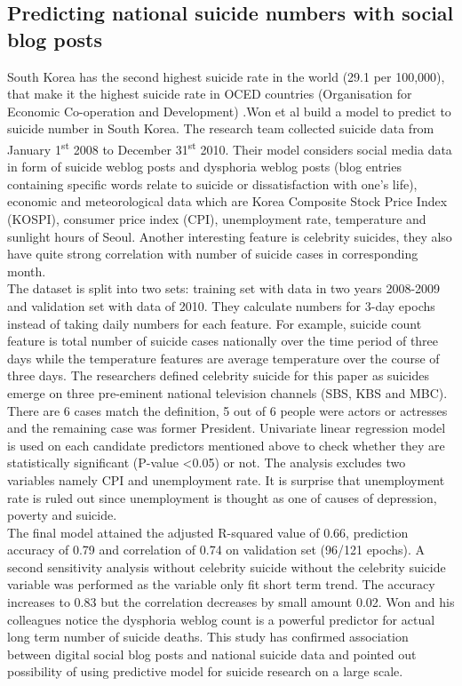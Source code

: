 \subsection{Predicting national suicide numbers with social blog posts}
South Korea has the second highest suicide rate in the world (29.1 per 100,000), that make it the highest suicide rate in OCED countries (Organisation for Economic Co-operation and Development) \cite{Yoon2015}.Won et al \cite{Won2013} build a model to predict to suicide number in South Korea. The research team collected suicide data from January 1\textsuperscript{st} 2008 to December 31\textsuperscript{st} 2010. Their model considers social media data in form of suicide weblog posts and dysphoria weblog posts (blog entries containing specific words relate to suicide or dissatisfaction with one’s life), economic and meteorological data which are Korea Composite Stock Price Index (KOSPI), consumer price index (CPI), unemployment rate, temperature and sunlight hours of Seoul. Another interesting feature is celebrity suicides, they also have quite strong correlation with number of suicide cases in corresponding month.\\
The dataset is split into two sets: training set with data in two years 2008-2009 and validation set with data of 2010. They calculate numbers for 3-day epochs instead of taking daily numbers for each feature. For example, suicide count feature is total number of suicide cases nationally over the time period of three days while the temperature features are average temperature over the course of three days. The researchers defined celebrity suicide for this paper as suicides emerge on three pre-eminent national television channels (SBS, KBS and MBC). There are 6 cases match the definition, 5 out of 6 people were actors or actresses and the remaining case was former President. Univariate linear regression model is used on each candidate predictors mentioned above to check whether they are statistically significant (P-value \textless  0.05) or not. The analysis excludes two variables namely CPI and unemployment rate. It is surprise that unemployment rate is ruled out since unemployment is thought as one of causes of depression, poverty and suicide.\\
The final model attained the adjusted R-squared value of 0.66, prediction accuracy of 0.79 and correlation of 0.74 on validation set (96/121 epochs). A second sensitivity analysis without celebrity suicide without the celebrity suicide variable was performed as the variable only fit short term trend. The accuracy increases to 0.83 but the correlation decreases by small amount 0.02. Won and his colleagues notice the dysphoria weblog count is a powerful predictor for actual long term number of suicide deaths. This study has confirmed association between digital social blog posts and national suicide data and pointed out possibility of using predictive model for suicide research on a large scale. \\

